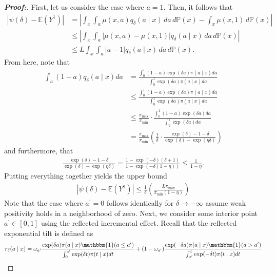 \documentclass[11pt,twoside]{article}
\newcommand{\Pb}{\mathbb{P}}
\newcommand{\E}{\mathbb{E}}
\theoremstyle{definition}
\theoremstyle{remark}
\begin{document}
\begin{proof}[\textbf{Proof:}]
First, let us consider the case where $a = 1$. Then, it follows that
\begin{align*}
     | \psi(\delta) - \E(Y^1)| &=  \left| \int_x \int_a \mu(x,a) q_\delta(a \mid x) \, da \, d\Pb(x) - \int_x \mu(x,1) \, d\Pb(x) \right| \\
     &\leq  \left| \int_x \int_a \left| \mu(x,a) - \mu(x, 1) \right| q_\delta(a \mid x) \, da \, d\Pb(x)\right| \\
     &\leq L \int_x \int_a |a-1| q_\delta(a \mid x) \, da \, d\Pb(x). 
\end{align*}
From here, note that
\begin{align*}
     \int_a (1-a) q_\delta(a \mid x) da &= \frac{\int^1_0 (1 - a) \exp(\delta a) \pi(a \mid x) da}{\int^1_0 \exp(\delta a) \pi(a \mid x) da } \\
     &\leq \frac{\int^1_0 (1 - a) \exp(\delta a) \pi(a \mid x) da}{\int^1_\eta \exp(\delta a) \pi(a \mid x) da } \\
     &\leq \frac{\pi_{\max}}{\pi_{\min}} \cdot  \frac{\int^1_0 (1 - a) \exp(\delta a)  da}{\int^1_\eta \exp(\delta a) da } \\
     &=  \frac{\pi_{\max}}{\pi_{\min}}\left( \frac{1}{\delta} \cdot \frac{\exp(\delta)-1-\delta}{\exp(\delta)- \exp(\eta \delta)} \right)
\end{align*}
and furthermore, that
\begin{align*}
    \frac{\exp(\delta)-1-\delta}{\exp(\delta)- \exp(\eta \delta)} = \frac{1 -\exp(-\delta)(\delta + 1)}{1 - \exp(-\delta(1 - \eta))} \leq \frac{1}{1 - \eta}.
\end{align*}
Putting everything together yields the upper bound
\begin{align*}
    | \psi(\delta) - \E(Y^1)| \leq \frac{1}{\delta} \left( \frac{L \pi_{\max}}{\pi_{\min}(1 - \eta)} \right)
\end{align*}
Note that the case where $a^\prime = 0$ follows identically for $\delta \to -\infty$ assume weak positivity holds in a neighborhood of zero. Next, we consider some interior point $a^\prime \in [0, 1]$ using the reflected incremental effect. Recall that the reflected exponential tilt is defined as
\begin{align*}
    r_\delta(a \mid x) =  \omega_{a^\prime}\frac{\text{exp}(\delta a) \pi(a \mid x) \mathbbm{1}(a \leq a^\prime) }{\int^{a^\prime}_0 \text{exp}(\delta t) \pi(t \mid x) dt} +  (1-\omega_{a^\prime})\frac{\text{exp}(-\delta a) \pi(a \mid x) \mathbbm{1}(a > a^\prime)}{\int^{1}_{a^\prime} \text{exp}(-\delta t) \pi(t \mid x) dt}

\end{align*}
\end{proof}
\end{document}
